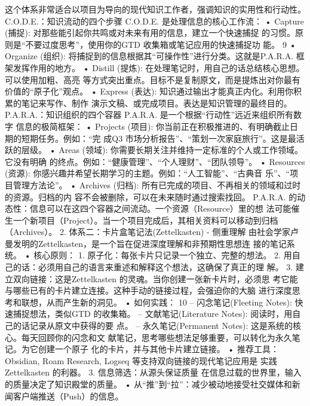\documentclass[a4paper,12pt]{article}
\begin{document}
\begin{multicols}{2}
    这个体系非常适合以项目为导向的现代知识工作者，强调知识的实用性和行动性。
    C.O.D.E.：知识流动的四个步骤 C.O.D.E. 是处理信息的核心工作流： •
    Capture (捕捉):
    对那些能引起你共鸣或对未来有用的信息，建立一个快速捕捉
    的习惯。原则是``不要过度思考''，使用你的GTD
    收集箱或笔记应用的快速捕捉功 能。 9 • Organize (组织):
    将捕捉到的信息根据其``可操作性''进行分类。这就是P.A.R.A.
    框架发挥作用的地方。 • Distill (提炼):
    在处理笔记时，用自己的话总结核心思想。可以使用加粗、高亮
    等方式突出重点。目标不是复制原文，而是提炼出对你最有价值的``原子化''观点。
    • Express (表达):
    知识通过输出才能真正内化。利用你积累的笔记来写作、制作
    演示文稿、或完成项目。表达是知识管理的最终目的。
    P.A.R.A.：知识组织的四个容器 P.A.R.A.
    是一个根据``行动性''远近来组织所有数字 信息的极简框架： • Projects
    (项目): 你当前正在积极推进的、有明确截止日期的短期任务。例如：``完
    成Q3 市场分析报告''、``策划一次家庭旅行''。这是最活跃的层级。 •
    Areas (领域):
    你需要长期关注并维持一定标准的个人或工作领域。它没有明确
    的终点。例如：``健康管理''、``个人理财''、``团队领导''。 • Resources
    (资源): 你感兴趣并希望长期学习的主题。例如：``人工智能''、``古典音
    乐''、``项目管理方法论''。 • Archives (归档):
    所有已完成的项目、不再相关的领域和过时的资源。归档的内
    容不会被删除，可以在未来随时通过搜索找回。 P.A.R.A.
    的动态性：信息可以在这四个容器之间流动。一个资源（Resource）里的想
    法可能催生一个新项目（Project）。当一个项目完成后，其相关资料可以移动到归档
    （Archives）。 2. 体系二：卡片盒笔记法(Zettelkasten) - 侧重理解
    由社会学家卢曼发明的Zettelkasten，是一个旨在促进深度理解和非预期性思想连
    接的笔记系统。 • 核心原则： 1.
    原子化：每张卡片只记录一个独立、完整的想法。 2.
    用自己的话：必须用自己的语言来重述和解释这个想法，这确保了真正的理
    解。 3. 建立双向链接：这是Zettelkasten
    的灵魂。当你创建一张新卡片时，必须思
    考它能与哪些已有的卡片建立连接。这种手动的链接过程，会强迫你的大脑
    进行深度思考和联想，从而产生新的洞见。 • 如何实践： 10 --
    闪念笔记(Fleeting Notes): 快速捕捉想法，类似GTD 的收集箱。 --
    文献笔记(Literature Notes): 阅读时，用自己的话记录从原文中获得的要
    点。 -- 永久笔记(Permanent Notes):
    这是系统的核心。每天回顾你的闪念和文
    献笔记，思考哪些想法足够重要，可以转化为永久笔记。为它创建一个原子
    化的卡片，并与其他卡片建立链接。 • 推荐工具：Obsidian, Roam
    Research, Logseq 等支持双向链接的现代笔记应用是 实践Zettelkasten
    的利器。 3. 信息筛选：从源头保证质量
    在信息过载的世界里，输入的质量决定了知识殿堂的质量。 •
    从``推''到``拉''：减少被动地接受社交媒体和新闻客户端推送（Push）的信息。

\end{multicols}
\end{document}
